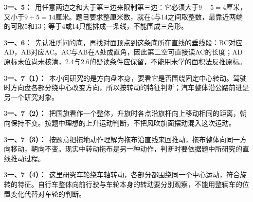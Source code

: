 \documentclass[multi=snippet,border={5bp 20bp 5bp 5bp}]{standalone}
\newenvironment{snippet}[3]{\begin{minipage}{#1bp}\color{answerred}\fontsize{#2}{#3}\selectfont\raggedright}{\end{minipage}}
\begin{document}
\begin{snippet}{505}{11.5}{14}\begin{multicols}{3}\raggedcolumns \textbf{一、5：}\ 用任意两边之和大于第三边来限制第三边：它必须大于\(9-5=4\)\allowbreak 厘米，又小于\(9+5=14\)\allowbreak 厘米。题目要求整厘米数，就在4与14之间取整数，最靠近两端的可取5和13；等于4或14只能排成一条线，不能围成三角形。\end{multicols}\end{snippet}
\begin{snippet}{505}{11.5}{14}\begin{multicols}{3}\raggedcolumns \textbf{一、6：}\ 先认准所问的底，再找对面顶点到这条底所在直线的垂线段：BC对应AD，AB对应AC。AC与AB在A处成直角，因此第二空可直接读AC的长度；AD原标末位尚未核清，2.4与2.6的疑读条件应保留，不能用未学的面积法反推原标。\end{multicols}\end{snippet}
\begin{snippet}{505}{11.5}{14}\begin{multicols}{3}\raggedcolumns \textbf{一、7（1）：}\ 本小问研究的是方向盘本身，要看它是否围绕固定中心转动。驾驶时方向盘各部分绕中心改变方向，所以按转动的特征判断；汽车整体沿公路前进是另一个研究对象。\end{multicols}\end{snippet}
\begin{snippet}{505}{11.5}{14}\begin{multicols}{3}\raggedcolumns \textbf{一、7（2）：}\ 把国旗看作一个整体，升旗时各点沿旗杆向上移动相同的距离，朝向保持不变。按题中理想的上升运动判断，不把风吹旗面摆动混入这次运动。\end{multicols}\end{snippet}
\begin{snippet}{505}{11.5}{14}\begin{multicols}{3}\raggedcolumns \textbf{一、7（3）：}\ 按题意把拖地动作理解为拖布沿直线来回推动，拖布整体向同一方向移动，朝向不变。现实中转动拖布是另一种动作，判断时要依据题中所研究的直线推动过程。\end{multicols}\end{snippet}
\begin{snippet}{505}{11.5}{14}\begin{multicols}{3}\raggedcolumns \textbf{一、7（4）：}\ 这里研究车轮绕车轴转动，各部分都围绕同一个中心运动，符合旋转的特征。自行车整体向前行驶与车轮本身的转动要分别观察，不能用整辆车的位置变化代替对车轮的判断。\end{multicols}\end{snippet}
\end{document}
